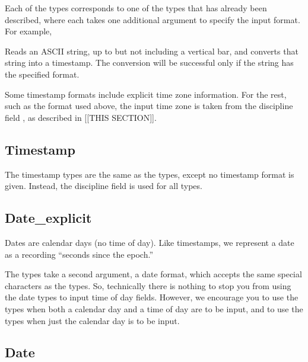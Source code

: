 Each of the  types corresponds to one of the 
types that has already been described, where each takes one additional argument
to specify the input format.  For example,

%
\noindent
Reads an ASCII string, up to but not including a vertical bar, and
converts that string into a  timestamp.  The conversion will be
successful only if the string has the specified format.

Some timestamp formats include explicit time zone information.  For
the rest, such as the format used above, the input time zone is taken
from the \pads{} discipline field , as
described in [[THIS SECTION]].

\subsection{Timestamp}

\aedBegin{}
\aedEnd{}

The timestamp types are the same as the  types,
except no timestamp format is given.  Instead, the \pads{}
discipline field  is used
for all  types.

\subsection{Date\_explicit}

\aedBegin{}
\aedEnd{}

Dates are calendar days (no time of day).  Like timestamps, we
represent a date as a  recording ``seconds since the epoch.''

The  types take a second argument, a date format,
which accepts the same special characters as the  types.
So, technically there is nothing to stop you from using the date types
to input time of day fields.  However, we encourage you to use the
 types when both a calendar day and a time of day are to be
input, and to use the  types when just the calendar day is to be
input.

\subsection{Date}

